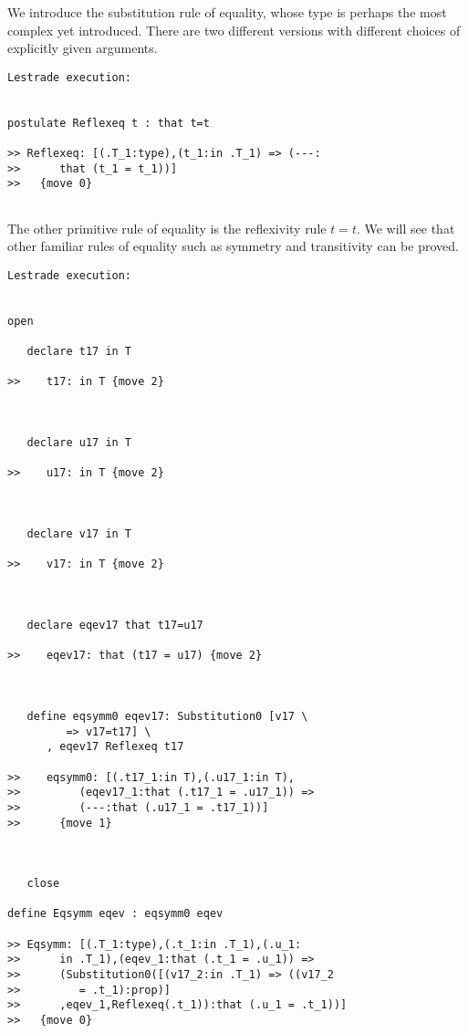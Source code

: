 \documentclass[12pt]{article}
\begin{document}
We introduce the substitution rule of equality, whose type is perhaps the most complex yet introduced.   There are two different versions with different choices of explicitly given arguments.

\begin{verbatim}Lestrade execution:


postulate Reflexeq t : that t=t

>> Reflexeq: [(.T_1:type),(t_1:in .T_1) => (---:
>>      that (t_1 = t_1))]
>>   {move 0}


\end{verbatim}

The other primitive rule of equality is the reflexivity rule $t=t$.  We will see that other familiar rules of equality such as symmetry and transitivity can be proved.

\begin{verbatim}Lestrade execution:


open

   declare t17 in T

>>    t17: in T {move 2}



   declare u17 in T

>>    u17: in T {move 2}



   declare v17 in T

>>    v17: in T {move 2}



   declare eqev17 that t17=u17

>>    eqev17: that (t17 = u17) {move 2}



   define eqsymm0 eqev17: Substitution0 [v17 \
         => v17=t17] \
      , eqev17 Reflexeq t17

>>    eqsymm0: [(.t17_1:in T),(.u17_1:in T),
>>         (eqev17_1:that (.t17_1 = .u17_1)) =>
>>         (---:that (.u17_1 = .t17_1))]
>>      {move 1}



   close

define Eqsymm eqev : eqsymm0 eqev

>> Eqsymm: [(.T_1:type),(.t_1:in .T_1),(.u_1:
>>      in .T_1),(eqev_1:that (.t_1 = .u_1)) =>
>>      (Substitution0([(v17_2:in .T_1) => ((v17_2
>>         = .t_1):prop)]
>>      ,eqev_1,Reflexeq(.t_1)):that (.u_1 = .t_1))]
>>   {move 0}


\end{verbatim}
\end{document}
